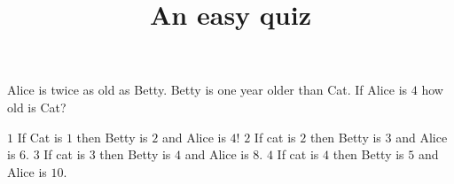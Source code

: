 \documentclass{mathquiz}
\title{An easy quiz}
\begin{document}
  \begin{question}
     Alice is twice as old as Betty. Betty is one year older than Cat.
     If Alice is $4$ how old is Cat?

     \begin{choice}
       \correct $1$
         \response If Cat is $1$ then Betty is $2$ and Alice is $4$!
       \incorrect $2$
         \response If cat is $2$ then Betty is $3$ and Alice is $6$.
       \incorrect $3$
         \response If cat is $3$ then Betty is $4$ and Alice is $8$.
       \incorrect $4$
         \response If cat is $4$ then Betty is $5$ and Alice is $10$.
     \end{choice}
  \end{question}
\end{document}
